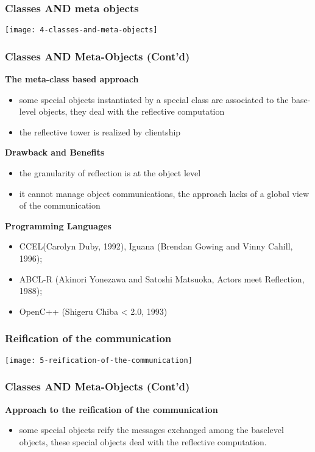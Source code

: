 \subsubsection{Classes AND meta objects}

\begin{center}
\texttt{[image: 4-classes-and-meta-objects]}
\end{center}

\subsubsection{Classes AND Meta-Objects (Cont'd)}
\textbf{The meta-class based approach}
\begin{itemize}
	\item some special objects instantiated by a special class are associated to the base-level objects, they deal with the reflective computation
	\item the reflective tower is realized by clientship
\end{itemize}

\textbf{Drawback and Benefits}
\begin{itemize}
	\item the granularity of reflection is at the object level
	\item it cannot manage object communications, the approach lacks of a global view of the communication
\end{itemize}

\textbf{Programming Languages}
\begin{itemize}
	\item CCEL(Carolyn Duby, 1992), Iguana (Brendan Gowing and Vinny Cahill, 1996);
	\item ABCL-R (Akinori Yonezawa and Satoshi Matsuoka, Actors meet Reflection, 1988);
	\item OpenC++ (Shigeru Chiba < 2.0, 1993)
\end{itemize}

\subsubsection{Reification of the communication}

\begin{center}
\texttt{[image: 5-reification-of-the-communication]}
\end{center}

\subsubsection{Classes AND Meta-Objects (Cont'd)}
\textbf{Approach to the reification of the communication}
\begin{itemize}
	\item some special objects reify the messages exchanged among the baselevel objects, these special objects deal with the reflective computation.
\end{itemize}

